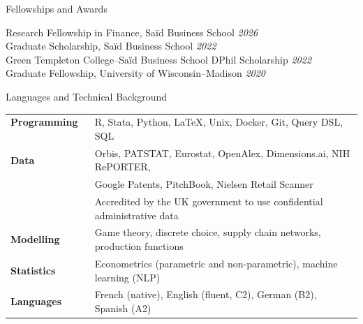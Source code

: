 \documentclass{resume} %
\begin{document}
\begin{rSection}{Fellowships and Awards}

Research Fellowship in Finance, Sa\"{i}d Business School \hfill {\em 2026} \\
Graduate Scholarship, Sa\"{i}d Business School \hfill {\em 2022} \\
Green Templeton College--Sa\"{i}d Business School DPhil Scholarship \hfill {\em 2022} \\
Graduate Fellowship, University of Wisconsin--Madison \hfill {\em 2020}

\end{rSection}



\begin{rSection}{Languages and Technical Background}

\begin{tabular}{ @{} >{\bfseries}l @{\hspace{3ex}} l }
Programming \ & R, Stata, Python, LaTeX, Unix, Docker, Git, Query DSL, SQL \\
Data \ & Orbis, PATSTAT, Eurostat, OpenAlex, Dimensions.ai, NIH RePORTER, \\ \ & Google Patents, PitchBook, Nielsen Retail Scanner \\
 \ & Accredited by the UK government to use confidential administrative data \\
Modelling \ & Game theory, discrete choice, supply chain networks, production functions \\
Statistics \ & Econometrics (parametric and non-parametric), machine learning (NLP) \\
Languages \ & French (native), English (fluent, C2), German (B2), Spanish (A2) \\
\end{tabular}

\end{rSection}


%
%
\end{document}
